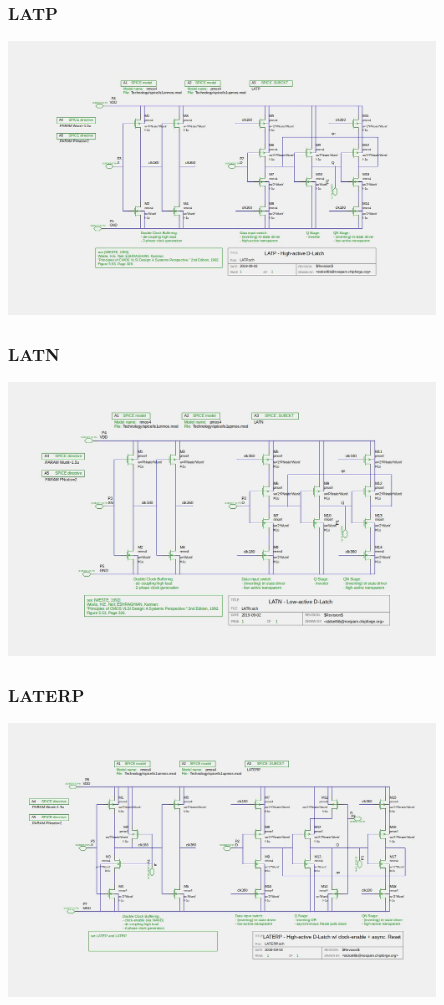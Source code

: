\documentclass[aspectratio=169]{beamer}
\begin{document}

\begin{frame}
\frametitle{LATP}
    \begin{center}
        \includegraphics[width=0.85\textwidth]{LATP.jpeg}
    \end{center}
\end{frame}

\begin{frame}
\frametitle{LATN}
    \begin{center}
        \includegraphics[width=0.85\textwidth]{LATN.jpeg}
    \end{center}
\end{frame}

\begin{frame}
\frametitle{LATERP}
    \begin{center}
        \includegraphics[width=0.85\textwidth]{LATERP.jpeg}
    \end{center}
\end{frame}
\end{document}
